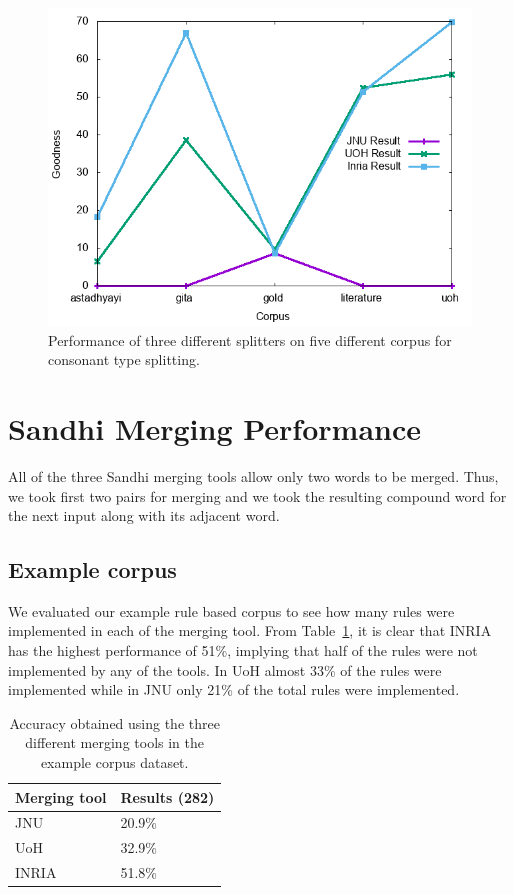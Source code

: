 \documentclass[11pt]{article}
\begin{document}
\begin{figure}[h]
	\center
	\includegraphics[scale=0.34]{images/consonant.png}
	\caption{\label{gr_3}Performance of three different splitters on five different corpus for consonant type splitting.}
\end{figure}


\section{Sandhi Merging Performance}

All of the three Sandhi merging tools allow only two words to be merged. Thus, we took first two pairs for merging and we took the resulting compound word for the next input along with its adjacent word.

\subsection{Example corpus}
We evaluated our example rule based corpus to see how many rules were implemented in each of the merging tool.
From Table~\ref{ev_ex_me}, it is clear that INRIA has the highest performance of 51\%, implying that half of the rules were not implemented by any of the tools. In UoH almost 33\% of the rules were implemented while in JNU only 21\% of the total rules were implemented.
\begin{table}[h]
	\begin{center}
		\begin{tabular}{|l|l|}
			\hline \bf Merging tool & \bf Results (282) \\ \hline
			JNU&20.9\% \\ \hline
			UoH&32.9\% \\ \hline
			INRIA&51.8\% \\ \hline
		\end{tabular}
	\end{center}
	\caption{\label{ev_ex_me} Accuracy obtained using the three different merging tools in the example corpus dataset.}
\end{table}
\end{document}
